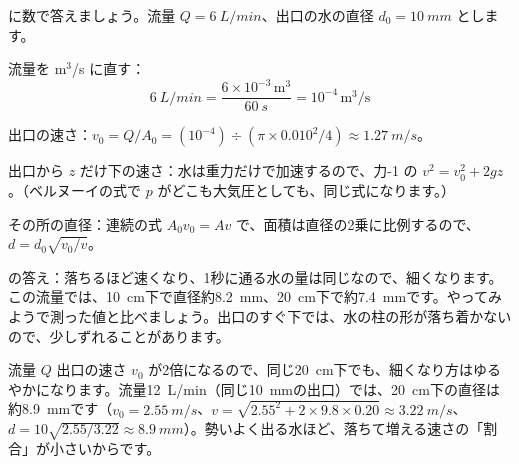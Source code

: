 \leavevmode\label{ph:力-13:sec4}\bkhatenaref に数で答えましょう。流量 $Q=\qty{6}{L/min}$、出口の水の直径 $d_0=\qty{10}{mm}$ とします。
\begin{enumerate}[label={\bkcircled[bkBlue]{\arabic*}}, leftmargin=2.4\zw, itemsep=2pt, topsep=2pt]
\item 流量を m$^3$/s に直す：
\[ \qty{6}{L/min}=\frac{6\times10^{-3}\,\mathrm{m^3}}{\qty{60}{s}}=10^{-4}\,\mathrm{m^3/s} \]
\item 出口の速さ：$v_0=Q/A_0=(10^{-4})\div (\pi\times0.010^2/4)\approx\qty{1.27}{m/s}$。
\item 出口から $z$ だけ下の速さ：水は重力だけで加速するので、力-1 の $v^2=v_0^2+2gz$。（ベルヌーイの式で $p$ がどこも大気圧としても、同じ式になります。）
\item その所の直径：連続の式 $A_0v_0=Av$ で、面積は直径の2乗に比例するので、$d=d_0\sqrt{v_0/v}$。
\end{enumerate}
\begin{bkcenter}
\end{bkcenter}
\label{ph:力-13:jaguchi}\bkhatenaref の答え：落ちるほど速くなり、1秒に通る水の量は同じなので、細くなります。この流量では、\qty{10}{cm}下で直径約\qty{8.2}{mm}、\qty{20}{cm}下で約\qty{7.4}{mm}です。やってみようで測った値と比べましょう。出口のすぐ下では、水の柱の形が落ち着かないので、少しずれることがあります。

\begin{phbaisuru}{流量 $Q$}
出口の速さ $v_0$ が2倍になるので、同じ\qty{20}{cm}下でも、細くなり方はゆるやかになります。流量\qty{12}{L/min}（同じ\qty{10}{mm}の出口）では、\qty{20}{cm}下の直径は約\qty{8.9}{mm}です（$v_0=\qty{2.55}{m/s}$、$v=\sqrt{2.55^2+2\times9.8\times0.20}\approx\qty{3.22}{m/s}$、$d=10\sqrt{2.55/3.22}\approx\qty{8.9}{mm}$）。勢いよく出る水ほど、落ちて増える速さの「割合」が小さいからです。
\end{phbaisuru}


